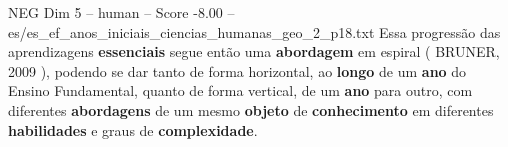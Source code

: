 \begin{textsample}{NEG Dim 5 – human – Score -8.00 – es/es\_ef\_anos\_iniciais\_ciencias\_humanas\_geo\_2\_p18.txt}  \label{ex:f5_neg_020}
Essa progressão das aprendizagens \textbf{essenciais} segue então uma \textbf{abordagem} em espiral ( BRUNER, 2009 ), podendo se dar tanto de forma horizontal, ao \textbf{longo} de um \textbf{ano} do Ensino Fundamental, quanto de forma vertical, de um \textbf{ano} para outro, com diferentes \textbf{abordagens} de um mesmo \textbf{objeto} de \textbf{conhecimento} em diferentes \textbf{habilidades} e graus de \textbf{complexidade}.

\end{textsample}
